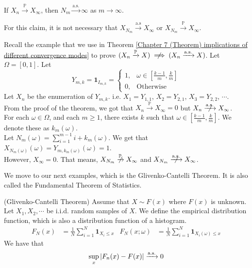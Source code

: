 \documentclass{huhtakm-template-book}
\newcommand{\prob}{\mathbb{P}}
\begin{document}
\begin{cla}
	If $X_{n}\xrightarrow{\prob}X_{\infty}$, then $N_{m}\xrightarrow{\text{a.s.}}\infty$ as $m\to\infty$.
\end{cla}
\begin{rem}
	For this claim, it is not necessary that $X_{N_{m}}\xrightarrow{\text{a.s}}X_{\infty}$ or $X_{N_{m}}\xrightarrow{\prob}X_{\infty}$.
\end{rem}
\begin{eg}
	Recall the example that we use in Theorem \ref{Chapter 7 (Theorem) implications of different convergence modes} to prove $(X_{n}\xrightarrow{\prob}X)\centernot\implies(X_{n}\xrightarrow{\text{a.s.}}X)$. Let $\Omega=[0,1]$. Let
	\begin{equation*}
		Y_{m,k}=\mathbf{1}_{I_{m,k}}=\begin{cases}
			1, &\omega\in\left[\frac{k-1}{m},\frac{k}{m}\right]\\
			0, &\text{Otherwise}
		\end{cases}
	\end{equation*}
	Let $X_{n}$ be the enumeration of $Y_{m,k}$. i.e. $X_{1}=Y_{1,1}$, $X_{2}=Y_{2,1}$, $X_{3}=Y_{2,2}$, $\cdots$.\\
	From the proof of the theorem, we got that $X_{n}\xrightarrow{\prob}X_{\infty}=0$ but $X_{n}\centernot{\xrightarrow{\text{a.s.}}}X_{\infty}$.\\
	For each $\omega\in\Omega$, and each $m\geq 1$, there exists $k$ such that $\omega\in\left[\frac{k-1}{m},\frac{k}{m}\right]$. We denote these as $k_{m}(\omega)$.\\
	Let $N_{m}(\omega)=\sum_{i=1}^{m-1}i+k_{m}(\omega)$. We get that $X_{N_{m}(\omega)}(\omega)=Y_{m,k_{m}(\omega)}(\omega)=1$.\\
	However, $X_{\infty}=0$. That means, $X_{N_{m}}\centernot{\xrightarrow{\prob}}X_{\infty}$ and $X_{N_{m}}\centernot{\xrightarrow{\text{a.s.}}}X_{\infty}$.
\end{eg}
We move to our next examples, which is the Glivenko-Cantelli Theorem. It is also called the Fundamental Theorem of Statistics.
\begin{thm}(Glivenko-Cantelli Theorem)
	Assume that $X\sim F(x)$ where $F(x)$ is unknown. Let $X_{1},X_{2},\cdots$ be i.i.d. random samples of $X$. We define the empirical distribution function, which is also a distribution function of a histogram.
	\begin{align*}
		F_{N}(x)&=\frac{1}{N}\sum_{i=1}^{N}\mathbf{1}_{X_{i}\leq x} & F_{N}(x;\omega)&=\frac{1}{N}\sum_{i=1}^{N}\mathbf{1}_{X_{i}(\omega)\leq x}
	\end{align*}
	We have that
	\begin{equation*}
		\sup_{x}\left|{F_{n}(x)-F(x)}\right|\xrightarrow{\text{a.s.}}0
	\end{equation*}
\end{thm}
\end{document}
